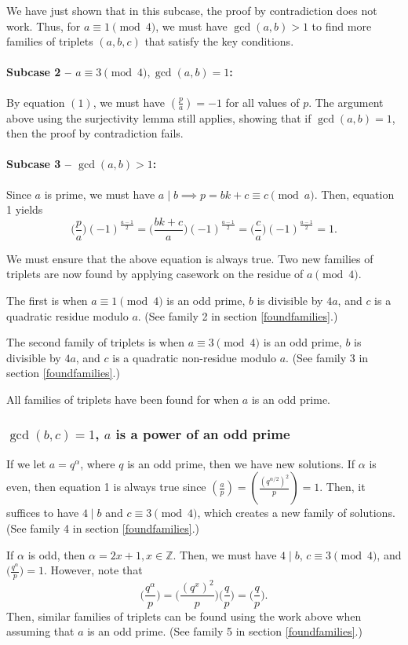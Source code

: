 \documentclass{article}
\newcommand{\Z}{\mathbb{Z}}
\newcommand{\al}{\alpha}
\newcommand{\qrbg}[2]{\bigg( \frac{#1}{#2}\bigg)}
\newcommand{\qrn}[2]{\left( \frac{#1}{#2}\right)}
\begin{document}
We have just shown that in this subcase, the proof by contradiction does not work. Thus, for $a\equiv 1\pmod 4$, we must have $\gcd(a,b)>1$ to find more families of triplets $(a,b,c)$ that satisfy the key conditions.

\paragraph{Subcase 2 -- $a \equiv 3 \pmod 4, \gcd(a,b)=1$:} By equation $(1)$, we must have $\qrn{p}{a}=-1$ for all values of $p$. The argument above using the surjectivity lemma still applies, showing that if $\gcd(a,b)=1$, then the proof by contradiction fails.

\paragraph{Subcase 3 -- $\gcd(a,b) > 1$:}
Since $a$ is prime, we must have $a \mid b \implies p = bk+c \equiv c \pmod a$. Then, equation 1 yields
\[\qrbg{p}{a} (-1)^{\frac{a-1}{2}} = \qrbg{bk+c}{a} (-1)^{\frac{a-1}{2}} = \qrbg{c}{a} (-1)^{\frac{a-1}{2}} = 1.\]

We must ensure that the above equation is always true. Two new families of triplets are now found by applying casework on the residue of $a \pmod 4$.

The first is when $a \equiv 1 \pmod 4$ is an odd prime, $b$ is divisible by $4a$, and $c$ is a quadratic residue modulo $a$. (See family 2 in section \ref{foundfamilies}.)

The second family of triplets is when $a \equiv 3 \pmod 4$ is an odd prime, $b$ is divisible by $4a$, and $c$ is a quadratic non-residue modulo $a$. (See family 3 in section \ref{foundfamilies}.)

All families of triplets have been found for when $a$ is an odd prime.
\subsubsection{$\gcd(b,c)=1$, $a$ is a power of an odd prime}
If we let $a=q^{\al}$, where $q$ is an odd prime, then we have new solutions. If $\al$ is even, then equation 1 is always true since $\qrn{a}{p}=\qrn{(q^{\al/2})^2}{p}= 1$. Then, it suffices to have $4 \mid b$ and $c \equiv 3 \pmod 4$, which creates a new family of solutions. (See family 4 in section \ref{foundfamilies}.)

If $\al$ is odd, then $\al = 2x+1, x \in \Z$. Then, we must have $4 \mid b$, $c \equiv 3 \pmod 4$, and $\qrbg{q^{\al}}{p}=1$. However, note that \begin{equation}\label{alphaodd}\qrbg{q^{\al}}{p}=\qrbg{(q^{x})^2}{p}\qrbg{q}{p}=\qrbg{q}{p}.\end{equation} Then, similar families of triplets can be found using the work above when assuming that $a$ is an odd prime. (See family 5 in section \ref{foundfamilies}.)
\end{document}

